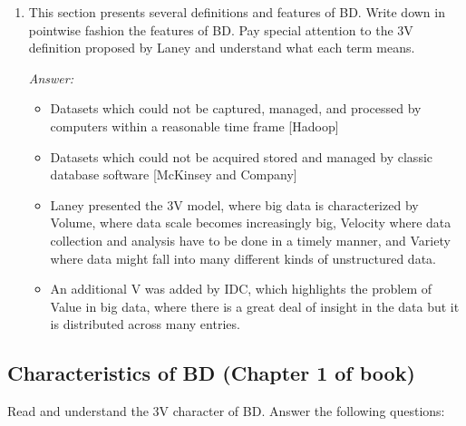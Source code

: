 \documentclass[11pt]{article}
\newcommand{\answer}{\vspace{0.25em}\par\textit{Answer:}\vspace{0.25em}\par}
\begin{document}
\begin{enumerate}
  \item This section presents several definitions and features of BD.
    Write down in pointwise
    fashion the features of BD. Pay special attention to the 3V
    definition proposed by Laney
    and understand what each term means.
    \answer
    \begin{itemize}
      \item Datasets which could not be captured, managed, and
        processed by computers within
        a reasonable time frame [Hadoop]
      \item Datasets which could not be acquired stored and managed
        by classic database software [McKinsey and Company]
      \item Laney presented the 3V model, where big data is
        characterized by Volume, where data scale becomes
        increasingly big, Velocity where data collection and analysis
        have to be done in a timely manner, and Variety where data
        might fall into many different kinds of unstructured data.
      \item An additional V was added by IDC, which highlights the
        problem of Value in big data, where there is a great deal of
        insight in the data but it is distributed across many entries.
    \end{itemize}
\end{enumerate}

\subsection*{Characteristics of BD (Chapter 1 of book)}

Read and understand the 3V character of BD. Answer the following questions:
\end{document}
